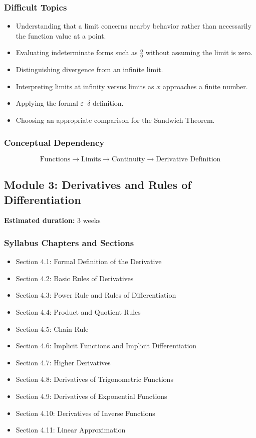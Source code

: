 \documentclass[11pt]{article}
\begin{document}
\subsubsection{Difficult Topics}

\begin{itemize}
    \item Understanding that a limit concerns nearby behavior rather than necessarily the function value at a point.
    \item Evaluating indeterminate forms such as $\frac{0}{0}$ without assuming the limit is zero.
    \item Distinguishing divergence from an infinite limit.
    \item Interpreting limits at infinity versus limits as $x$ approaches a finite number.
    \item Applying the formal $\varepsilon$--$\delta$ definition.
    \item Choosing an appropriate comparison for the Sandwich Theorem.
\end{itemize}

\subsubsection{Conceptual Dependency}

\[
\text{Functions} \longrightarrow \text{Limits} \longrightarrow \text{Continuity}
\longrightarrow \text{Derivative Definition}
\]

\subsection{Module 3: Derivatives and Rules of Differentiation}

\textbf{Estimated duration:} 3 weeks

\subsubsection{Syllabus Chapters and Sections}

\begin{itemize}
    \item Section 4.1: Formal Definition of the Derivative
    \item Section 4.2: Basic Rules of Derivatives
    \item Section 4.3: Power Rule and Rules of Differentiation
    \item Section 4.4: Product and Quotient Rules
    \item Section 4.5: Chain Rule
    \item Section 4.6: Implicit Functions and Implicit Differentiation
    \item Section 4.7: Higher Derivatives
    \item Section 4.8: Derivatives of Trigonometric Functions
    \item Section 4.9: Derivatives of Exponential Functions
    \item Section 4.10: Derivatives of Inverse Functions
    \item Section 4.11: Linear Approximation
\end{itemize}
\end{document}

